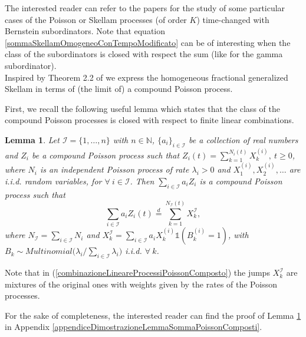\documentclass[12pt, twoside, english, headsepline]{article}
\newtheorem{lemma}[theorem]{Lemma}
\theoremstyle{definition} %
\numberwithin{equation}{section} %
\begin{document}
The interested reader can refer to the papers \cite{BS2024, GKL2020, KK2024, OT2015} for the study of some particular cases of the Poisson or Skellam processes (of order $K$) time-changed with Bernstein subordinators. Note that equation \eqref{sommaSkellamOmogeneoConTempoModificato} can be of interesting when the class of the subordinators is closed with respect the sum (like for the gamma subordinator).
\\


Inspired by Theorem 2.2 of \cite{OT2015} we express the homogeneous fractional generalized Skellam in terms of (the limit of) a compound Poisson process. 

First, we recall the following useful lemma which states that the class of the compound Poisson processes is closed with respect to finite linear combinations.

\begin{lemma}\label{lemmaSommaProcessioPoissonComposto}
Let $ \mathcal{I} = \{1,\dots,n\}$ with $n\in\mathbb{N}$, $\{a_i\}_{i\in\mathcal{I}}$ be a collection of real numbers and $Z_i$ be a compound Poisson process such that  $Z_i(t) = \sum_{k=1}^{N_i(t)}  X^{(i)}_k,\ t\ge0$, where $N_i$ is an independent Poisson process of rate $\lambda_i>0$ and $X_1^{(i)},X_2^{(i)},\dots$ are i.i.d. random variables, for $\forall\ i\in\mathcal{I}$. Then $\sum_{i\in\mathcal{I}}a_i Z_i$ is a compound Poisson process such that
\begin{equation}\label{combinazioneLineareProcessiPoissonComposto}
\sum_{i\in\mathcal{I}}a_i Z_i (t)\stackrel{d}{=} \sum_{k=1}^{N_\mathcal{I}(t)} X_k^\mathcal{I} ,
\end{equation}
where $N_\mathcal{I} = \sum_{i\in\mathcal{I}}N_i$ and $X_k^\mathcal{I} = \sum_{i\in\mathcal{I}} a_i X_k^{(i)} \mathds{1}(B_k^{(i)} = 1)$, with $B_k\sim Multinomial\bigl(\lambda_i/\sum_{i\in\mathcal{I}}\lambda_i\bigr)$ i.i.d. $\forall\ k$.
\end{lemma}

Note that in (\ref{combinazioneLineareProcessiPoissonComposto}) the jumps $X_k^{\mathcal{I}}$ are mixtures of the original ones with weights given by the rates of the Poisson processes.

For the sake of completeness, the interested reader can find the proof of Lemma \ref{lemmaSommaProcessioPoissonComposto} in Appendix \ref{appendiceDimostrazioneLemmaSommaPoissonComposti}.
\end{document}
